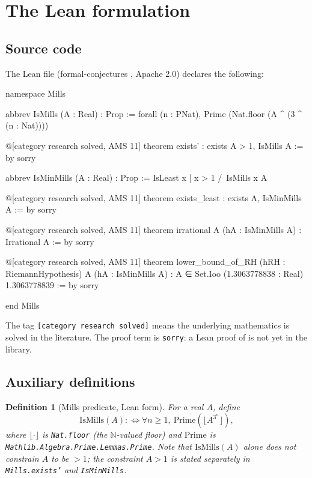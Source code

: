 \documentclass[11pt,reqno]{amsart}
\providecommand{\N}{\mathbb{N}}
\theoremstyle{redplain}
\newtheorem{definition}{Definition}[section]
\numberwithin{equation}{section}
\begin{document}
\section{The Lean formulation}
\label{sec:lean}

\subsection{Source code}
\label{sec:lean-source}

The Lean file 
(formal-conjectures \cite{FormalConjectures}, Apache 2.0) declares the
following:

\begin{verbatimbox}
namespace Mills

abbrev IsMills (A : Real) : Prop :=
  forall (n : PNat), Prime (Nat.floor (A ^ (3 ^ (n : Nat))))

@[category research solved, AMS 11]
theorem exists' : exists A > 1, IsMills A := by sorry

abbrev IsMinMills (A : Real) : Prop :=
  IsLeast {x | x > 1 /\ IsMills x} A

@[category research solved, AMS 11]
theorem exists_least : exists A, IsMinMills A := by sorry

@[category research solved, AMS 11]
theorem irrational {A} (hA : IsMinMills A) : Irrational A := by sorry

@[category research solved, AMS 11]
theorem lower_bound_of_RH (hRH : RiemannHypothesis) {A} (hA : IsMinMills A) :
    A ∈ Set.Ioo (1.3063778838 : Real) 1.3063778839 := by sorry

end Mills
\end{verbatimbox}

\noindent The tag \texttt{[category research solved]} means the underlying
mathematics is solved in the literature. The proof term is \texttt{sorry}:
a Lean proof of  is not yet in the library.

\subsection{Auxiliary definitions}
\label{sec:lean-defs}

\begin{definition}[Mills predicate, Lean form]
\label{def:lean-ismills}
For a real $A$, define
\[
\mathrm{IsMills}(A):\iff\forall n\ge1,\ \mathrm{Prime}(\lfloor A^{3^n}\rfloor),
\]
where $\lfloor\cdot\rfloor$ is \texttt{Nat.floor} (the $\N$-valued floor)
and $\mathrm{Prime}$ is \texttt{Mathlib.Algebra.Prime.Lemmas.Prime}. Note
that $\mathrm{IsMills}(A)$ alone does not constrain $A$ to be $>1$; the
constraint $A>1$ is stated separately in \texttt{Mills.exists'} and
\texttt{IsMinMills}.
\end{definition}
\end{document}
